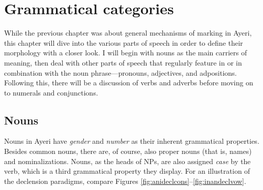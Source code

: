 
\chapter{Grammatical categories}

While the previous chapter was about general mechanisms of marking in Ayeri, 
this chapter will dive into the various parts of speech in order to define 
their morphology with a closer look. I will begin with nouns as the main 
carriers of meaning, then deal with other parts of speech that regularly 
feature in or in combination with the noun phrase---pronouns, adjectives, and 
adpositions. Following this, there will be a discussion of verbs and adverbs 
before moving on to numerals and conjunctions.

\section{Nouns}
\label{sec:nouns}

Nouns in Ayeri have \emph{gender} and \emph{number} as their inherent
grammatical properties. Besides common nouns, there are, of course, also proper
nouns (that is, names) and nominalizations. Nouns, as the heads of NPs, are
also assigned \emph{case} by the verb, which is a third grammatical property
they display. For an illustration of the declension paradigms, compare Figures
\ref{fig:anideclcons}–\ref{fig:inandeclvow}.

